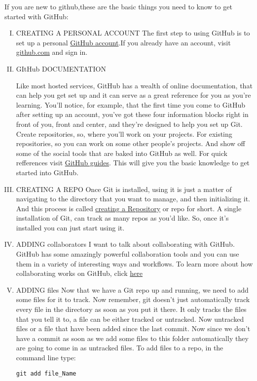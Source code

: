 \documentclass[11pt,utf8]{article}
\begin{document}
If you are new to github,these are the basic things you need to know to get started with GitHub:
\begin{enumerate}[I.]
\item CREATING A PERSONAL ACCOUNT
The first step to using GitHub is to set up a personal \href{https://help.github.com/articles/signing-up-for-a-new-github-account/}{GitHub account}.If you already have an account, visit \href{https://github.com/}{github.com} and sign in.

\item GItHub DOCUMENTATION
        

Like most hosted services, GitHub has a wealth of online documentation, that can help you get set up and it can serve as a great reference for you as you're learning. You'll notice, for example, that the first time you come to GitHub after setting up an account, you've got these four information blocks right in front of you, front and center, and they're designed to help you set up Git. Create repositories, so, where you'll work on your projects. For existing repositories, so you can work on some other people's projects. And show off some of the social tools that are baked into GitHub as well. For quick refferences visit \href{https://guides.github.com/}{GitHub guides}. This will give you the basic knowledge to get started into GitHub.

\item CREATING A REPO
Once Git is installed, using it is just a matter of navigating to the directory that you want to manage, and then initializing it. And this process is called \href{https://help.github.com/articles/create-a-repo/}{creating a Repository} or repo for short. A single installation of Git, can track as many repos as you'd like. So, once it's installed you can just start using it.
\item ADDING collaborators
I want to talk about collaborating with GitHub. GitHub has some amazingly powerful collaboration tools and you can use them in a variety of interesting ways and workflows. To learn more about how collaborating works on GitHub, click \href{https://help.github.com/categories/collaborating/}{here}

\item ADDING files
Now that we have a Git repo up and running, we need to add some files for it to track. Now remember, git doesn't just automatically track every file in the directory as soon as you put it there. It only tracks the files that you tell it to, a file can be either tracked or untracked. Now untracked files or a file that have been added since the last commit. Now since we don't have a commit as soon as we add some files to this folder automatically they are going to come in as untracked files. To add files to a repo, in the command line type:
\begin{lstlisting}
git add file_Name
\end{lstlisting}


\end{enumerate}
\end{document}
